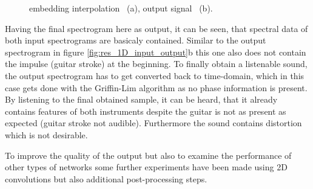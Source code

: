 \begin{figure}[htb!]
    \centering
    \caption{embedding interpolation ~(a), output signal ~(b).}
    \label{fig:res_1D_interpolation}
\end{figure}

Having the final spectrogram here as output, it can be seen, that spectral data of both input spectrograms are basicaly contained. Similar to the output spectrogram in figure \ref{fig:res_1D_input_output}b this one also does not contain the impulse (guitar stroke) at the beginning. To finally obtain a listenable sound, the output spectrogram has to get converted back to time-domain, which in this case gets done with the Griffin-Lim algorithm \cite{Griffin1984} as no phase information is present. By listening to the final obtained sample, it can be heard, that it already contains features of both instruments despite the guitar is not as present as expected (guitar stroke not audible). Furthermore the sound contains distortion which is not desirable.

To improve the quality of the output but also to examine the performance of other types of networks some further experiments have been made using 2D convolutions but also additional post-processing steps.

